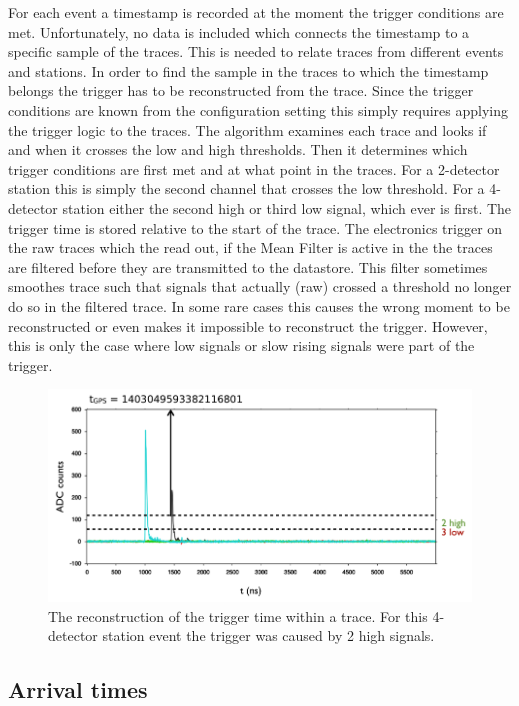 For each event a \gps timestamp is recorded at the moment the trigger conditions are met. Unfortunately, no data is included which connects the \gps timestamp to a specific sample of the traces. This is needed to relate traces from different events and stations. In order to find the sample in the traces to which the \gps timestamp belongs the trigger has to be reconstructed from the trace. Since the trigger conditions are known from the configuration setting this simply requires applying the trigger logic to the traces. The algorithm examines each trace and looks if and when it crosses the low and high thresholds. Then it determines which trigger conditions are first met and at what point in the traces. For a 2-detector station this is simply the second channel that crosses the low threshold. For a 4-detector station either the second high or third low signal, which ever is first. The trigger time is stored relative to the start of the trace. The \hisparc electronics trigger on the raw traces which the \adcs read out, if the Mean Filter is active in the \daq the traces are filtered before they are transmitted to the datastore. This filter sometimes smoothes trace such that signals that actually (raw) crossed a threshold no longer do so in the filtered trace. In some rare cases this causes the wrong moment to be reconstructed or even makes it impossible to reconstruct the trigger. However, this is only the case where low signals or slow rising signals were part of the trigger.

\begin{figure}
    \centering
    \includegraphics[width=0.7\linewidth]{plots/processing/trigger_time.png}
    \caption{The reconstruction of the trigger time within a trace. For this 4-detector station event the trigger was caused by 2 high signals.}
    \label{fig:trigger_time}
\end{figure}


\subsection{Arrival times}

